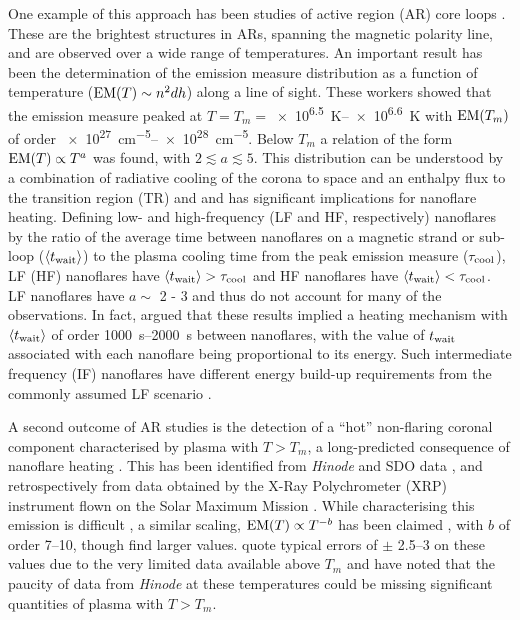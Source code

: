 One example of this approach has been studies of active region (AR) core loops \citep{warren_constraints_2011,warren_systematic_2012,winebarger_using_2011,tripathi_emission_2011,schmelz_cold_2012,bradshaw_diagnosing_2012,reep_diagnosing_2013,del_zanna_evolution_2015}. These are the brightest structures in ARs, spanning the magnetic polarity line, and are observed over a wide range of temperatures. An important result has been the determination of the emission measure distribution as a function of temperature ($\emd[T]\sim n^2dh$) along a line of sight. These workers showed that the emission measure peaked at $T = T_m = $\SIrange{e6.5}{e6.6}{\kelvin} with $\emd[T_m]$ of order \SIrange{e27}{e28}{\cm\tothe{-5}}. Below $T_m$ a relation of the form $\emd[T] \propto T^a$ was found, with $2\lesssim a\lesssim 5$. This distribution can be understood by a combination of radiative cooling of the corona to space and an enthalpy flux to the transition region (TR) \citep[e.g.][]{bradshaw_cooling_2010,bradshaw_new_2010} and and has significant implications for nanoflare heating. Defining low- and high-frequency (LF and HF, respectively) nanoflares by the ratio of the average time between nanoflares on a magnetic strand or sub-loop ($\langle t_\textup{wait} \rangle$) to the plasma cooling time from the peak emission measure ($\tau_\textup{cool}$), LF (HF) nanoflares have $\langle t_\textup{wait} \rangle > \tau_\textup{cool}$ and HF nanoflares have $\langle t_\textup{wait} \rangle < \tau_\textup{cool}$. LF nanoflares have $a \sim$ 2 - 3 and thus do not account for many of the observations. In fact, \citet{cargill_active_2014} argued that these results implied a heating mechanism with $\langle t_\textup{wait} \rangle$ of order \SIrange{1000}{2000}{\second} between nanoflares, with the value of $t_\textup{wait}$ associated with each nanoflare being proportional to its energy. Such intermediate frequency (IF) nanoflares have different energy build-up requirements from the commonly assumed LF scenario \citep{cargill_active_2014}.

A second outcome of AR studies is the detection of a ``hot'' non-flaring coronal component characterised by plasma with $T > T_m$, a long-predicted consequence of nanoflare heating \citep{cargill_implications_1994,cargill_diagnostics_1995}. This has been identified from \textit{Hinode} and SDO data \citep{reale_evidence_2009,schmelz_hinode_2009,testa_hinode/eis_2012}, and retrospectively from data obtained by the X-Ray Polychrometer (XRP) instrument flown on the Solar Maximum Mission \citep{del_zanna_elemental_2014}. While characterising this emission is difficult \citep[e.g.][]{testa_temperature_2011,winebarger_defining_2012}, a similar scaling, $\emd[T] \propto T^{-b}$ has been claimed \citep[e.g.][]{warren_systematic_2012}, with $b$ of order \numrange{7}{10}, though \citeauthor{del_zanna_elemental_2014} find larger values. \citeauthor{warren_systematic_2012} quote typical errors of $\pm$ \numrange{2.5}{3} on these values due to the very limited data available above $T_m$ and \citeauthor{winebarger_defining_2012} have noted that the paucity of data from \textit{Hinode} at these temperatures could be missing significant quantities of plasma with $T > T_m$.
    
